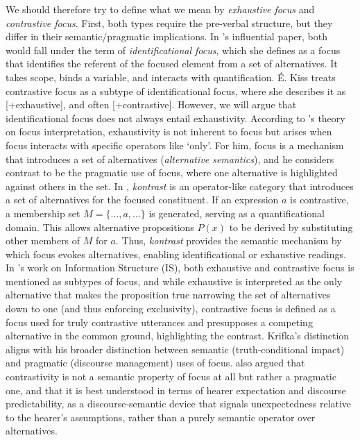 \documentclass[a4paper, ruler]{CUP-JNL-LIN}%
\begin{document}
We should therefore try to define what we mean by \textit{exhaustive focus} and \textit{contrastive focus}. First, both types require the pre-verbal structure, but they differ in their semantic/pragmatic implications. In \citet{ekiss_1998_identificational}'s influential paper, both would fall under the term of \textit{identificational focus}, which she defines as a focus that identifies the referent of the focused element from a set of alternatives. It takes scope, binds a variable, and interacts with quantification. É. Kiss treats contrastive focus as a subtype of identificational focus, where she describes it as [+exhaustive], and often [+contrastive]. However, we will argue that identificational focus does not always entail exhaustivity. 
According to \citet{rooth_1992_theory}'s theory on focus interpretation, exhaustivity is not inherent to focus but arises when focus interacts with specific operators like `only'. For him, focus is a mechanism that introduces a set of alternatives (\textit{alternative semantics}), and he considers contrast to be the pragmatic use of focus, where one alternative is highlighted against others in the set.
In \citet{vallduvi_1998_rheme}, \textit{kontrast} is an operator-like category that introduces a set of alternatives for the focused constituent. If an expression $a$ is contrastive, a membership set $M = \{\ldots,a,\ldots\}$ is generated, serving as a quantificational domain. This allows alternative propositions $P(x)$ to be derived by substituting other members of $M$ for $a$. Thus, \textit{kontrast} provides the semantic mechanism by which focus evokes alternatives, enabling identificational or exhaustive readings.
In \citet[259]{krifka_2008_basic}'s work on Information Structure (IS), both exhaustive and contrastive focus is mentioned as subtypes of focus, and while exhaustive is interpreted as the only alternative that makes the proposition true narrowing the set of alternatives down to one (and thus enforcing exclusivity), contrastive focus is defined as a focus used for truly contrastive utterances and presupposes a competing alternative in the common ground, highlighting the contrast. Krifka's distinction aligns with his broader distinction between semantic (truth‑conditional impact) and pragmatic (discourse management) uses of focus. 
\citet{zimmermann_2008_contrastive} also argued that contrastivity is not a semantic property of focus at all but rather a pragmatic one, and that it is best understood in terms of hearer expectation and discourse predictability, as a discourse‑semantic device that signals unexpectedness relative to the hearer’s assumptions, rather than a purely semantic operator over alternatives.
\end{document}
